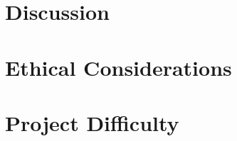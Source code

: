 \documentclass{article} %
\begin{document}
\section{Discussion}
\label{discussion}


\section{Ethical Considerations}



\section{Project Difficulty}



\label{last_page}



\end{document}
